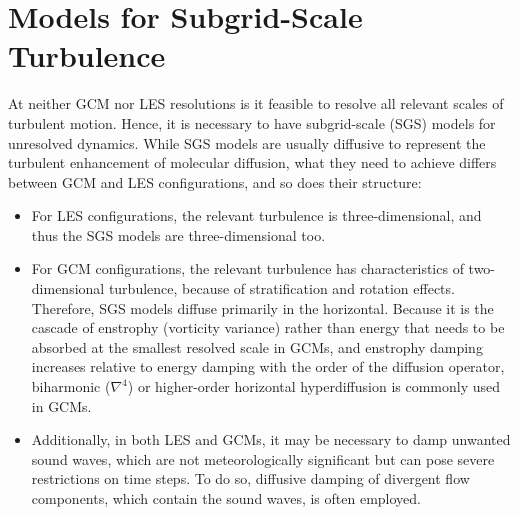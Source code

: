 \documentclass{report}
\begin{document}

\chapter{Models for Subgrid-Scale Turbulence}\label{c:sgs_models}

At neither GCM nor LES resolutions is it feasible to resolve all relevant scales of turbulent motion. Hence, it is necessary to have subgrid-scale (SGS) models for unresolved dynamics. While SGS models are usually diffusive to represent the turbulent enhancement of molecular diffusion,  what they need to achieve differs between GCM and LES configurations, and so does their structure:
\begin{itemize}
    \item For LES configurations, the relevant turbulence is three-dimensional, and thus the SGS models are three-dimensional too. 
    \item For GCM configurations, the relevant turbulence has characteristics of two-dim\-ensio\-nal turbulence, because of stratification and rotation effects. Therefore, SGS models diffuse primarily in the horizontal. Because it is the cascade of enstrophy (vorticity variance) rather than energy that needs to be absorbed at the smallest resolved scale in GCMs, and enstrophy damping increases relative to energy damping with the order of the diffusion operator, biharmonic ($\nabla^4$) or higher-order horizontal hyperdiffusion is commonly used in GCMs. 
    \item Additionally, in both LES and GCMs, it may be necessary to damp unwanted sound waves, which are not meteorologically significant but can pose severe restrictions on time steps. To do so, diffusive damping of divergent flow components, which contain the sound waves, is often employed. 
\end{itemize}
\end{document}
